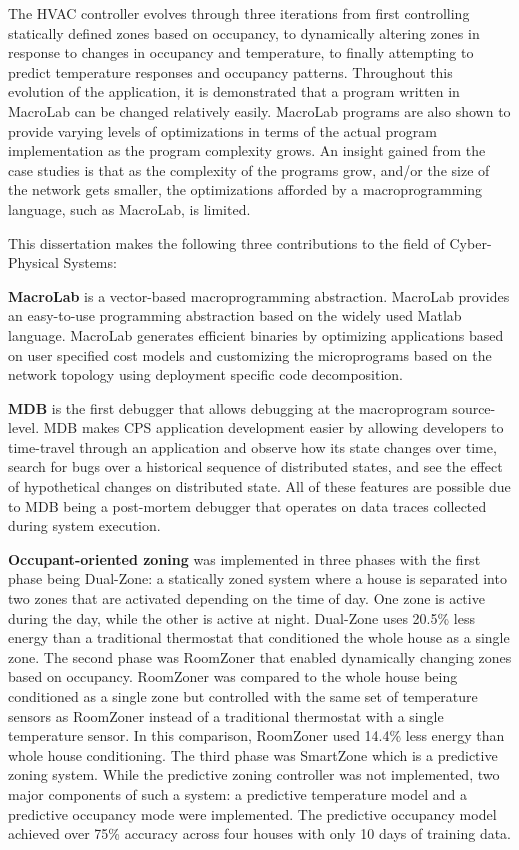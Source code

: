 The HVAC controller evolves through three iterations from first controlling
statically defined zones based on occupancy, to dynamically altering zones in
response to changes in occupancy and temperature, to finally attempting to
predict temperature responses and occupancy patterns. Throughout this evolution
of the application, it is demonstrated that a program written in MacroLab can be
changed relatively easily. MacroLab programs are also shown to provide varying
levels of optimizations in terms of the actual program implementation as the
program complexity grows. An insight gained from the case studies is that as the
complexity of the programs grow, and/or the size of the network gets smaller,
the optimizations afforded by a macroprogramming language, such as MacroLab, is
limited.

This dissertation makes the following three contributions to the field of
Cyber-Physical Systems:

\par{\bf MacroLab } is a vector-based macroprogramming abstraction. MacroLab
provides an easy-to-use programming abstraction based on the widely used Matlab
language. MacroLab generates efficient binaries by optimizing applications based
on user specified cost models and customizing the microprograms based on the
network topology using deployment specific code decomposition.

\par {\bf MDB } is the first debugger that allows debugging at the macroprogram
source-level. MDB makes CPS application development easier by allowing
developers to time-travel through an application and observe how its state
changes over time, search for bugs over a historical sequence of distributed
states, and see the effect of hypothetical changes on distributed state. All of
these features are possible due to MDB being a post-mortem debugger that
operates on data traces collected during system execution.

\par {\bf Occupant-oriented zoning } was implemented in three phases with the
first phase being Dual-Zone: a statically zoned system where a house is
separated into two zones that are activated depending on the time of day. One
zone is active during the day, while the other is active at night. Dual-Zone
uses 20.5\% less energy than a traditional thermostat that conditioned the whole
house as a single zone. The second phase was RoomZoner that enabled dynamically
changing zones based on occupancy. RoomZoner was compared to the whole house
being conditioned as a single zone but controlled with the same set of
temperature sensors as RoomZoner instead of a traditional thermostat with a
single temperature sensor. In this comparison, RoomZoner used 14.4\% less energy
than whole house conditioning. The third phase was SmartZone which is a
predictive zoning system. While the predictive zoning controller was not
implemented, two major components of such a system: a predictive temperature
model and a predictive occupancy mode were implemented. The predictive occupancy
model achieved over 75\% accuracy across four houses with only 10 days of
training data.

